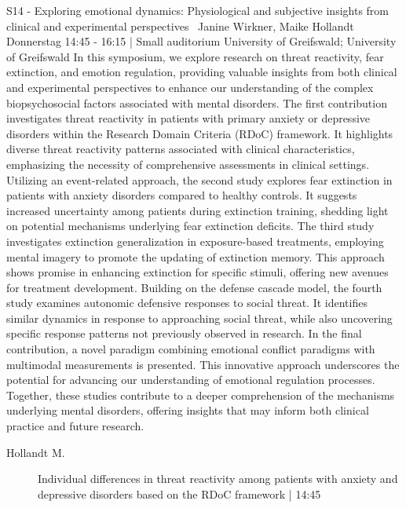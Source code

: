
            \begin{symposium}
            {S14 - Exploring emotional dynamics: Physiological and subjective insights from clinical and experimental perspectives }
            { Janine Wirkner, Maike Hollandt}
            {Donnerstag 14:45 - 16:15 | Small auditorium}
            {University of Greifswald; University of Greifswald}
            In this symposium, we explore research on threat reactivity, fear extinction, and emotion regulation, providing valuable insights from both clinical and experimental perspectives to enhance our understanding of the complex biopsychosocial factors associated with mental disorders.
The first contribution investigates threat reactivity in patients with primary anxiety or depressive disorders within the Research Domain Criteria (RDoC) framework. It highlights diverse threat reactivity patterns associated with clinical characteristics, emphasizing the necessity of comprehensive assessments in clinical settings. Utilizing an event-related approach, the second study explores fear extinction in patients with anxiety disorders compared to healthy controls. It suggests increased uncertainty among patients during extinction training, shedding light on potential mechanisms underlying fear extinction deficits. The third study investigates extinction generalization in exposure-based treatments, employing mental imagery to promote the updating of extinction memory. This approach shows promise in enhancing extinction for specific stimuli, offering new avenues for treatment development. Building on the defense cascade model, the fourth study examines autonomic defensive responses to social threat. It identifies similar dynamics in response to approaching social threat, while also uncovering specific response patterns not previously observed in research. In the final contribution, a novel paradigm combining emotional conflict paradigms with multimodal measurements is presented. This innovative approach underscores the potential for advancing our understanding of emotional regulation processes. Together, these studies contribute to a deeper comprehension of the mechanisms underlying mental disorders, offering insights that may inform both clinical practice and future research.
            \begin{description}    
            
                \item [ Hollandt M.] Individual differences in threat reactivity among patients with anxiety and depressive disorders based on the RDoC framework \textcolor{mygray}{ | 14:45}    
                

\end{description}
\end{symposium}
